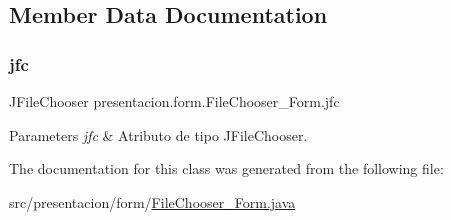 \subsection{Member Data Documentation}
\mbox{\label{classpresentacion_1_1form_1_1FileChooser__Form_a6fc55a912c266f0379aab09209dd858c}} 
\subsubsection{\texorpdfstring{jfc}{jfc}}
{\footnotesize\ttfamily J\+File\+Chooser presentacion.\+form.\+File\+Chooser\+\_\+\+Form.\+jfc\hspace{0.3cm}{\ttfamily [private]}}


\begin{DoxyParams}{Parameters}
{\em jfc} & Atributo de tipo J\+File\+Chooser. \\
\hline
\end{DoxyParams}


The documentation for this class was generated from the following file\+:\begin{DoxyCompactItemize}
\item 
src/presentacion/form/\hyperlink{FileChooser__Form_8java}{File\+Chooser\+\_\+\+Form.\+java}\end{DoxyCompactItemize}
